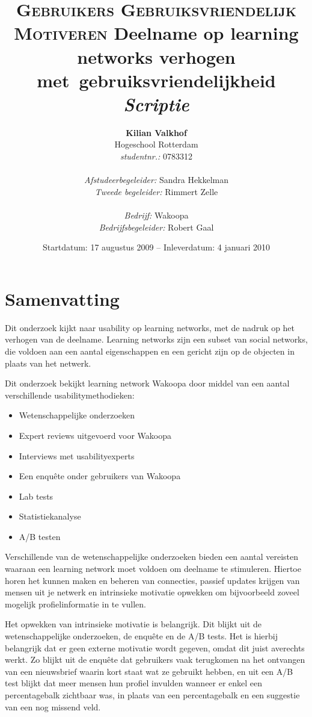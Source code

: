 \documentclass[a4paper, 10pt, pdftex]{report}
\title{\textsc{Gebruikers Gebruiksvriendelijk Motiveren}
  \linebreak Deelname op learning networks verhogen met~gebruiksvriendelijkheid \linebreak \linebreak \emph{Scriptie}}
\author{\textbf{Kilian Valkhof}\\
  Hogeschool Rotterdam\\
  \textit{studentnr.:} 0783312\\
  \\
  \textit{Afstudeerbegeleider:} Sandra Hekkelman\\
  \textit{Tweede begeleider:} Rimmert Zelle\\
  \\
  \textit{Bedrijf:} Wakoopa\\
  \textit{Bedrijfsbegeleider:} Robert Gaal}
\date{Startdatum: 17 augustus 2009 -- Inleverdatum: 4 januari 2010}
\begin{document}
  \normalem
  \maketitle

  \newpage
  \chapter*{Samenvatting}
    Dit onderzoek kijkt naar usability op learning networks, met de nadruk op het verhogen van de deelname. Learning networks zijn een subset van social networks, die voldoen aan een aantal eigenschappen en een gericht zijn op de objecten in plaats van het netwerk.

    Dit onderzoek bekijkt learning network Wakoopa door middel van een aantal verschillende usabilitymethodieken:
    \begin{itemize}
      \item Wetenschappelijke onderzoeken
      \item Expert reviews uitgevoerd voor Wakoopa
      \item Interviews met usabilityexperts
      \item Een enqu\^ete onder gebruikers van Wakoopa
      \item Lab tests
      \item Statistiekanalyse
      \item A/B testen
    \end{itemize}

    Verschillende van de wetenschappelijke onderzoeken bieden een aantal vereisten waaraan een learning network moet voldoen om deelname te stimuleren. Hiertoe horen het kunnen maken en beheren van connecties, passief updates krijgen van mensen uit je netwerk en intrinsieke motivatie opwekken om bijvoorbeeld zoveel mogelijk profielinformatie in te vullen.

    Het opwekken van intrinsieke motivatie is belangrijk. Dit blijkt uit de wetenschappelijke onderzoeken, de enqu\^ete en de A/B tests. Het is hierbij belangrijk dat er geen externe motivatie wordt gegeven, omdat dit juist averechts werkt. Zo blijkt uit de enqu\^ete dat gebruikers vaak terugkomen na het ontvangen van een nieuwsbrief waarin kort staat wat ze gebruikt hebben, en uit een A/B test blijkt dat meer mensen hun profiel invulden wanneer er enkel een percentagebalk zichtbaar was, in plaats van een percentagebalk en een suggestie van een nog missend veld.
\end{document}
